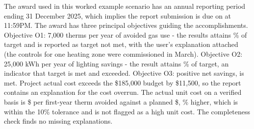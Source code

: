 \documentclass[10pt,twocolumn,letterpaper]{article}
\begin{document}
The award used in this worked example scenario has an annual reporting period ending 31 December 2025, which implies the report submission is due on \DueDate{} at 11:59PM. The award has three principal objectives guiding the accomplishments. Objective O1: 7,000 therms per year of avoided gas use - the results attains \OnePct\% of target and is reported as target not met, with the user's explanation attached (the controls for one heating zone were commissioned in March). Objective O2: 25,000 kWh per year of lighting savings - the result attains \TwoPct\% of target, an indicator that target is met and exceeded. Objective O3: positive net savings, is met. Project actual cost exceeds the \$185,000 budget by \$11,500, so the report contains an explanation for the cost overrun. The actual unit cost on a verified basis is \$\ActualUnit{} per first-year therm avoided against a planned \$\PlannedUnit, \UnitRatio\% higher, which is within the 10\% tolerance and is not flagged as a high unit cost. The completeness check finds no missing explanations.


\end{document}
